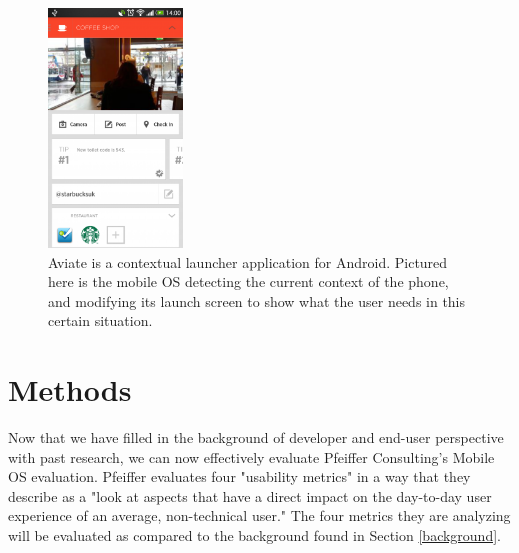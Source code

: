 \documentclass[11pt]{article}
\begin{document}
\begin{figure}[h]
\begin{center}
\includegraphics[height = 2.5in]{aviate}
\caption{Aviate is a contextual launcher application for Android. Pictured here is the mobile OS detecting the current context of the phone, and modifying its launch screen to show what the user needs in this certain situation. \cite{Aviate}}
\label{aviate}
\end{center}
\end{figure}


\section{Methods}
Now that we have filled in the background of developer and end-user perspective with past research, we can now effectively evaluate Pfeiffer Consulting's Mobile OS evaluation. Pfeiffer evaluates four "usability metrics" in a way that they describe as a "look at aspects that have a direct impact on the day-to-day user experience of an average, non-technical user." \cite{Pfeiffer} The four metrics they are analyzing will be evaluated as compared to the background found in Section \ref{background}.
\end{document}
